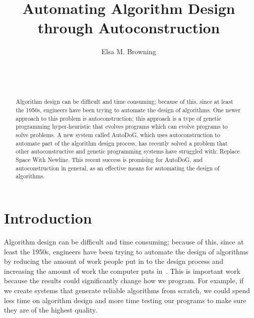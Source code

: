 \documentclass{sig-alternate}
\begin{document}

\title{Automating Algorithm Design through Autoconstruction}


\author{
\alignauthor
Elsa M. Browning\\
	\\
	\\
	\\
}

\maketitle
\begin{abstract}
	Algorithm design can be difficult and time consuming; because of this, since at least the 1950s, engineers have been trying to automate the design of algorithms. One newer approach to this problem is autoconstruction; this approach is a type of genetic programming hyper-heuristic that evolves programs which can evolve programs to solve problems. A new system called AutoDoG, which uses autoconstruction to automate part of the algorithm design process, has recently solved a problem that other autoconstructive and genetic programming systems have struggled with: Replace Space With Newline. This recent success is promising for AutoDoG, and autoconstruction in general, as an effective means for automating the design of algorithms.
\end{abstract}


\section{Introduction}
\label{sec:introduction}
Algorithm design can be difficult and time consuming; because of this, since at least the 1950s, engineers have been trying to automate the design of algorithms by reducing the amount of work people put in to the design process and increasing the amount of work the computer puts in~\cite{pappa:2014}. This is important work because the results could significantly change how we program. For example, if we create systems that generate reliable algorithms from scratch, we could spend less time on algorithm design and more time testing our programs to make sure they are of the highest quality.
\end{document}
